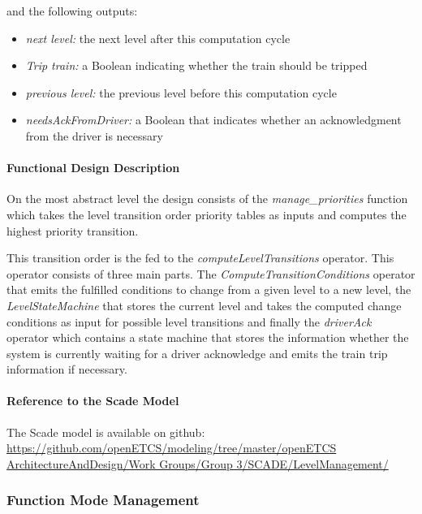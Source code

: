 and the following outputs:

\begin{itemize}
\item \emph{next level:} the next level after this computation cycle
\item \emph{Trip train:} a Boolean indicating whether the train should be
  tripped
\item \emph{previous level:} the previous level before this computation cycle
\item \emph{needsAckFromDriver:} a Boolean that indicates whether an
  acknowledgment from the driver is necessary
\end{itemize}

\paragraph{Functional Design Description}

On the most abstract level the design consists of the \emph{manage\_priorities} function which takes the level transition order priority tables as inputs and computes the highest priority transition.

This transition order is the fed to the \emph{computeLevelTransitions} operator. This operator consists of three main parts. The \emph{ComputeTransitionConditions} operator that emits the fulfilled conditions to change from a given level to a new level, the \emph{LevelStateMachine} that stores the current level and takes the computed change conditions as input for possible level transitions and finally the \emph{driverAck} operator which contains a state machine that stores the information whether the system is currently waiting for a driver acknowledge and emits the train trip information if necessary.


\paragraph{Reference to the Scade Model}

The Scade model is available on github:
\url{https://github.com/openETCS/modeling/tree/master/openETCS ArchitectureAndDesign/Work Groups/Group 3/SCADE/LevelManagement/}


\subsubsection{Function Mode Management}%
